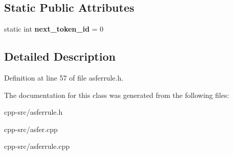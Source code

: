 \subsection*{Static Public Attributes}
\begin{DoxyCompactItemize}
\item 
\hypertarget{classasferrule_a8469c5e46472c25f76a15df1de95df1d}{static int {\bfseries next\-\_\-token\-\_\-id} = 0}\label{classasferrule_a8469c5e46472c25f76a15df1de95df1d}

\end{DoxyCompactItemize}


\subsection{Detailed Description}


Definition at line 57 of file asferrule.\-h.



The documentation for this class was generated from the following files\-:\begin{DoxyCompactItemize}
\item 
cpp-\/src/asferrule.\-h\item 
cpp-\/src/asfer.\-cpp\item 
cpp-\/src/asferrule.\-cpp\end{DoxyCompactItemize}
